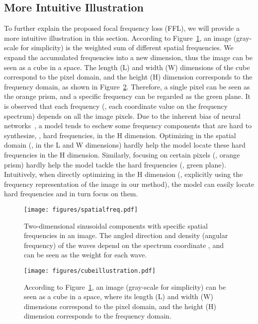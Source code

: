 \documentclass[10pt,twocolumn,letterpaper]{article}
\begin{document}
\subsection{More Intuitive Illustration}
\label{sec:intuitiveunders}
To further explain the proposed focal frequency loss (FFL), we will provide a more intuitive illustration in this section.
According to Figure~\ref{fig:spatialfreq}, an image (gray-scale for simplicity) is the weighted sum of different spatial frequencies. We expand the accumulated frequencies into a new dimension, thus the image can be seen as a cube in a space. The length (L) and width (W) dimensions of the cube correspond to the pixel domain, and the height (H) dimension corresponds to the frequency domain, as shown in Figure~\ref{fig:cubeillustration}. Therefore, a single pixel can be seen as the orange prism, and a specific frequency can be regarded as the green plane.
It is observed that each frequency (\ie, each coordinate value on the frequency spectrum) depends on all the image pixels. Due to the inherent bias of neural networks~\cite{spectralbias,fprinciple}, a model tends to eschew some frequency components that are hard to synthesize, \ie, hard frequencies, in the H dimension. Optimizing in the spatial domain (\ie, in the L and W dimensions) hardly help the model locate these hard frequencies in the H dimension. Similarly, focusing on certain pixels (\eg, orange prism) hardly help the model tackle the hard frequencies (\eg, green plane). Intuitively, when directly optimizing in the H dimension (\ie, explicitly using the frequency representation of the image in our method), the model can easily locate hard frequencies and in turn focus on them.


\begin{figure}[t]
	\centering
\texttt{[image: figures/spatialfreq.pdf]}
\caption{Two-dimensional sinusoidal components with specific spatial frequencies in an image. The angled direction and density (angular frequency) of the waves depend on the spectrum coordinate , and  can be seen as the weight for each wave.}
	\label{fig:spatialfreq}
	\vspace{-0.1cm}
\end{figure}


\begin{figure}[t]
	\centering
\texttt{[image: figures/cubeillustration.pdf]}
\caption{According to Figure~\ref{fig:spatialfreq}, an image (gray-scale for simplicity) can be seen as a cube in a space, where its length (L) and width (W) dimensions correspond to the pixel domain, and the height (H) dimension corresponds to the frequency domain.}
	\label{fig:cubeillustration}
	\vspace{-0.3cm}
\end{figure}
\end{document}
